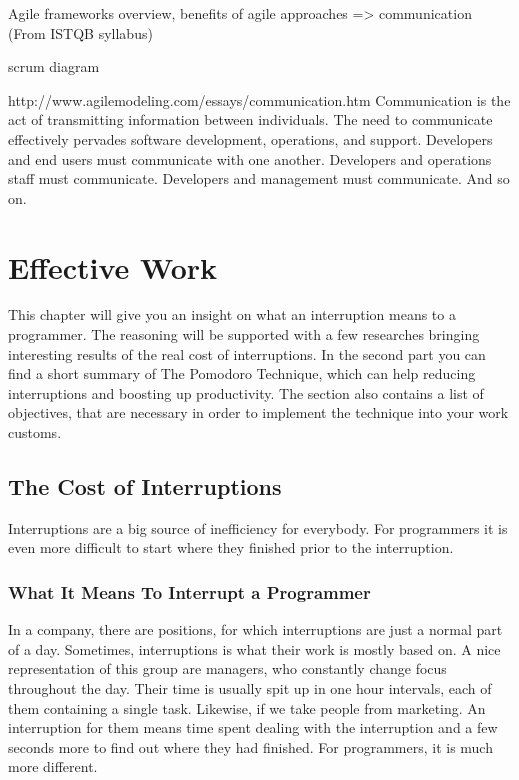 \documentclass[11pt,singleside]{myfithesis2}
\begin{document}
Agile frameworks overview, benefits of agile approaches => communication (From ISTQB syllabus)

scrum diagram

http://www.agilemodeling.com/essays/communication.htm
Communication is the act of transmitting information between individuals. The need to communicate effectively pervades software development, operations, and support. Developers and end users must communicate with one another. Developers and operations staff must communicate. Developers and management must communicate. And so on.




\chapter{Effective Work}

This chapter will give you an insight on what an interruption means to a programmer. The reasoning will be supported with a few researches bringing interesting results of the real cost of interruptions. In the second part you can find a short summary of The Pomodoro Technique, which can help reducing interruptions and boosting up productivity. The section also contains a list of objectives, that are necessary in order to implement the technique into your work customs.

	\section{The Cost of Interruptions}
Interruptions are a big source of inefficiency for everybody. For programmers it is even more difficult to start where they finished prior to the interruption.

		\subsection{What It Means To Interrupt a Programmer}
In a company, there are positions, for which interruptions are just a normal part of a day. Sometimes, interruptions is what their work is mostly based on. A nice representation of this group are managers, who constantly change focus throughout the day. Their time is usually spit up in one hour intervals, each of them containing a single task. Likewise, if we take people from marketing. An interruption for them means time spent dealing with the interruption and a few seconds more to find out where they had finished. For programmers, it is much more different.
\end{document}
